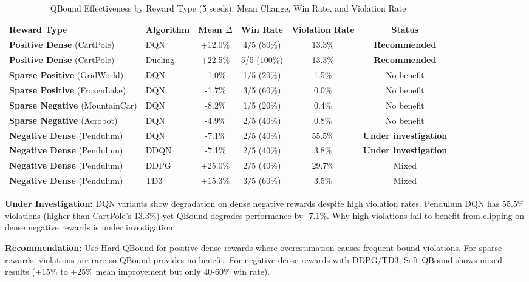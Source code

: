 \documentclass[11pt]{article}
\theoremstyle{definition}
\theoremstyle{remark}
\begin{document}
\begin{table}[h]
\centering
\caption{QBound Effectiveness by Reward Type (5 seeds): Mean Change, Win Rate, and Violation Rate}
\label{tab:reward-sign-summary-theory}
\small
\begin{tabular}{llcccc}
\toprule
Reward Type & Algorithm & Mean $\Delta$ & Win Rate & Violation Rate & Status \\
\midrule
\textbf{Positive Dense} (CartPole) & DQN & +12.0\% & 4/5 (80\%) & 13.3\% & \textbf{Recommended} \\
\textbf{Positive Dense} (CartPole) & Dueling & +22.5\% & 5/5 (100\%) & 13.3\% & \textbf{Recommended} \\
\midrule
\textbf{Sparse Positive} (GridWorld) & DQN & -1.0\% & 1/5 (20\%) & 1.5\% & No benefit \\
\textbf{Sparse Positive} (FrozenLake) & DQN & -1.7\% & 3/5 (60\%) & 0.0\% & No benefit \\
\midrule
\textbf{Sparse Negative} (MountainCar) & DQN & -8.2\% & 1/5 (20\%) & 0.4\% & No benefit \\
\textbf{Sparse Negative} (Acrobot) & DQN & -4.9\% & 2/5 (40\%) & 0.8\% & No benefit \\
\midrule
\textbf{Negative Dense} (Pendulum) & DQN & -7.1\% & 2/5 (40\%) & 55.5\% & \textbf{Under investigation} \\
\textbf{Negative Dense} (Pendulum) & DDQN & -7.1\% & 2/5 (40\%) & 3.8\% & \textbf{Under investigation} \\
\textbf{Negative Dense} (Pendulum) & DDPG & +25.0\% & 2/5 (40\%) & 29.7\% & Mixed \\
\textbf{Negative Dense} (Pendulum) & TD3 & +15.3\% & 3/5 (60\%) & 3.5\% & Mixed \\
\bottomrule
\end{tabular}
\end{table}

\textbf{Under Investigation:} DQN variants show degradation on dense negative rewards despite high violation rates. Pendulum DQN has 55.5\% violations (higher than CartPole's 13.3\%) yet QBound degrades performance by -7.1\%. Why high violations fail to benefit from clipping on dense negative rewards is under investigation.

\textbf{Recommendation:} Use Hard QBound for positive dense rewards where overestimation causes frequent bound violations. For sparse rewards, violations are rare so QBound provides no benefit. For negative dense rewards with DDPG/TD3, Soft QBound shows mixed results (+15\% to +25\% mean improvement but only 40-60\% win rate).
\end{document}
